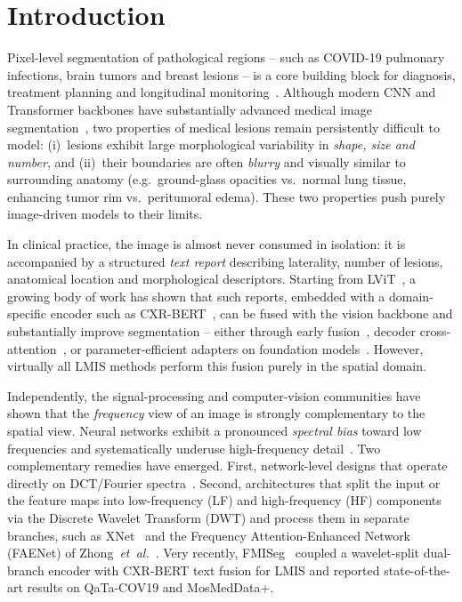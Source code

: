 \documentclass[runningheads]{llncs}
\begin{document}
\section{Introduction}
\label{sec:intro}

Pixel-level segmentation of pathological regions -- such as COVID-19
pulmonary infections, brain tumors and breast lesions -- is a core
building block for diagnosis, treatment planning and longitudinal
monitoring~\cite{ronneberger2015unet,isensee2021nnunet}. Although
modern CNN and Transformer backbones have substantially advanced
medical image segmentation~\cite{zhou2020unetpp,chen2024transunet,cao2022swinunet,wang2022uctransnet},
two properties of medical lesions remain persistently difficult to
model: (i)~lesions exhibit large morphological variability in
\emph{shape, size and number}, and (ii)~their boundaries are often
\emph{blurry} and visually similar to surrounding anatomy (e.g.\
ground-glass opacities vs.\ normal lung tissue, enhancing tumor rim
vs.\ peritumoral edema). These two properties push purely
image-driven models to their limits.

In clinical practice, the image is almost never consumed in
isolation: it is accompanied by a structured \emph{text report}
describing laterality, number of lesions, anatomical location and
morphological descriptors. Starting from
LViT~\cite{li2023lvit}, a growing body of work has shown that such
reports, embedded with a domain-specific encoder such as
CXR-BERT~\cite{boecking2022cxrbert}, can be fused with the vision
backbone and substantially improve segmentation --
either through early
fusion~\cite{li2023lvit,huang2024reclmis},
decoder cross-attention~\cite{zhong2023ariadne,chen2024causalclipseg,zhang2024madapter,guo2024tgcam},
or parameter-efficient adapters on foundation
models~\cite{hu2024lga,koleilat2024medclipsam}.
However, virtually all LMIS methods perform this fusion purely in the
spatial domain.

Independently, the signal-processing and computer-vision communities
have shown that the \emph{frequency} view of an image is strongly
complementary to the spatial view. Neural networks exhibit a
pronounced \emph{spectral bias} toward low frequencies and
systematically underuse high-frequency
detail~\cite{xu2022overview}. Two complementary remedies have
emerged. First, network-level designs that operate directly on
DCT/Fourier spectra~\cite{qin2021fcanet,zhang2023fsanet}. Second,
architectures that split the input or the feature maps into
low-frequency (LF) and high-frequency (HF) components via the
Discrete Wavelet Transform (DWT) and process them in separate
branches, such as
XNet~\cite{zhou2023xnet} and the Frequency Attention-Enhanced
Network (FAENet) of Zhong~\textit{et~al.}~\cite{zhong2025faenet}.
Very recently, FMISeg~\cite{yu2025fmiseg} coupled a wavelet-split
dual-branch encoder with CXR-BERT text fusion for LMIS and reported
state-of-the-art results on QaTa-COV19 and MosMedData+.
\end{document}
